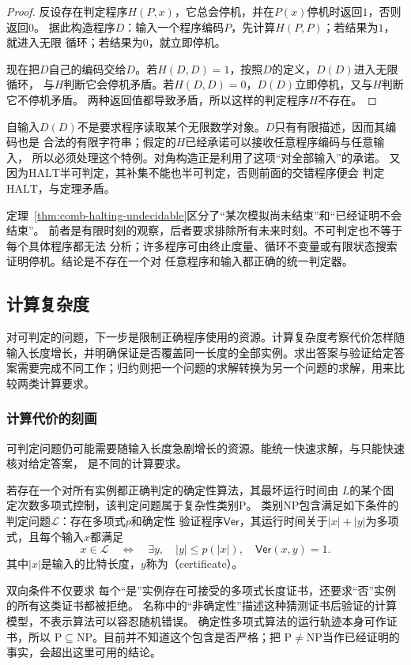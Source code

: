 \begin{proof}
反设存在判定程序$H(P,x)$，它总会停机，并在$P(x)$停机时返回$1$，否则返回$0$。
据此构造程序$D$：输入一个程序编码$P$，先计算$H(P,P)$；若结果为$1$，就进入无限
循环；若结果为$0$，就立即停机。

现在把$D$自己的编码交给$D$。若$H(D,D)=1$，按照$D$的定义，$D(D)$进入无限循环，
与$H$判断它会停机矛盾。若$H(D,D)=0$，$D(D)$立即停机，又与$H$判断它不停机矛盾。
两种返回值都导致矛盾，所以这样的判定程序$H$不存在。
\end{proof}

自输入$D(D)$不是要求程序读取某个无限数学对象。$D$只有有限描述，因而其编码也是
合法的有限字符串；假定的$H$已经承诺可以接收任意程序编码与任意输入，
所以必须处理这个特例。对角构造正是利用了这项“对全部输入”的承诺。
又因为$\mathrm{HALT}$半可判定，其补集不能也半可判定，否则前面的交错程序便会
判定$\mathrm{HALT}$，与定理矛盾。

定理~\ref{thm:comb-halting-undecidable}区分了“某次模拟尚未结束”和“已经证明不会结束”。
前者是有限时刻的观察，后者要求排除所有未来时刻。不可判定也不等于每个具体程序都无法
分析；许多程序可由终止度量、循环不变量或有限状态搜索证明停机。结论是不存在一个对
任意程序和输入都正确的统一判定器。

\subsection{计算复杂度}
\label{sec:comb-efficient-computation}

对可判定的问题，下一步是限制正确程序使用的资源。计算复杂度考察代价怎样随输入长度增长，并明确保证是否覆盖同一长度的全部实例。求出答案与验证给定答案需要完成不同工作；归约则把一个问题的求解转换为另一个问题的求解，用来比较两类计算要求。

\subsubsection{计算代价的刻画}
\label{sec:comb-time-certificates}

可判定问题仍可能需要随输入长度急剧增长的资源。能统一快速求解，与只能快速核对给定答案，
是不同的计算要求。
\begin{definition}[复杂性类别P与NP]
\label{def:comb-p-np}
若存在一个对所有实例都正确判定的确定性算法，其最坏运行时间由
$L$的某个固定次数多项式控制，该判定问题属于复杂性类别$\mathrm{P}$。
类别$\mathrm{NP}$包含满足如下条件的判定问题$\mathcal{L}$：存在多项式$p$和确定性
验证程序$\mathsf{Ver}$，其运行时间关于$|x|+|y|$为多项式，且每个输入$x$都满足
\[
  x\in\mathcal{L}
  \quad\Longleftrightarrow\quad
  \exists y,\quad |y|\leq p(|x|),\quad \mathsf{Ver}(x,y)=1.
\]
其中$|x|$是输入的比特长度，$y$称为（certificate）。
\end{definition}
双向条件不仅要求
每个“是”实例存在可接受的多项式长度证书，还要求“否”实例的所有这类证书都被拒绝。
名称中的“非确定性”描述这种猜测证书后验证的计算模型，不表示算法可以容忍随机错误。
确定性多项式算法的运行轨迹本身可作证书，所以
$\mathrm{P}\subseteq\mathrm{NP}$。目前并不知道这个包含是否严格；把
$\mathrm{P}\neq\mathrm{NP}$当作已经证明的事实，会超出这里可用的结论。

